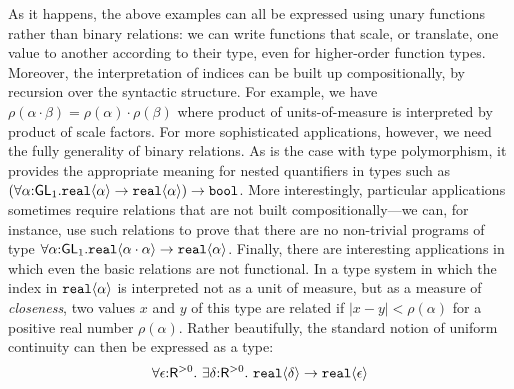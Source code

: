 \vspace*{0.1in}

As it happens, the above examples can all be expressed using unary
functions rather than binary relations: we can write functions that
scale, or translate, one value to another according to their type,
even for higher-order function types. Moreover, the interpretation of
indices can be built up compositionally, by recursion over the
syntactic structure. For example, we have $\rho(\alpha\cdot\beta) =
\rho(\alpha)\cdot\rho(\beta)$ where product of units-of-measure is
interpreted by product of scale factors. For more sophisticated
applications, however, we need the fully generality of binary
relations. As is the case with type polymorphism, it
provides the appropriate meaning for nested quantifiers in types such
as
$(\forall\alpha\mathord:\mathsf{GL}_1.\textup{\texttt{real}}\langle \alpha \rangle\to\textup{\texttt{real}}\langle \alpha \rangle)\to\texttt{bool}$.
More interestingly, particular applications sometimes require
relations that are not built compositionally---we can, for instance,
use such relations to prove that there are no non-trivial programs of
type
$\forall\alpha\mathord:\mathsf{GL}_1.\textup{\texttt{real}}\langle \alpha\cdot\alpha \rangle\to\textup{\texttt{real}}\langle \alpha \rangle$.
Finally, there are interesting applications in which even the basic
relations are not functional. In a type system in which the index in
$\textup{\texttt{real}}\langle \alpha \rangle$ is interpreted not as a unit of measure, but as
a measure of \emph{closeness}, two values $x$ and $y$ of this type are
related if $|x-y| < \rho(\alpha)$ for a positive real number
$\rho(\alpha)$.  Rather beautifully, the standard notion of uniform
continuity can then be expressed as a type:
\begin{displaymath}
  \forall \epsilon \mathord: \mathsf{R}^{>0}.\ \exists \delta\mathord: \mathsf{R}^{>0}.\ \textup{\texttt{real}}\langle \delta \rangle \to \textup{\texttt{real}}\langle \epsilon \rangle
\end{displaymath}



